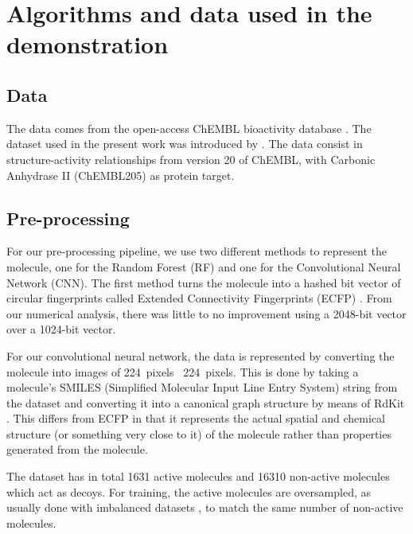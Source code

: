 \documentclass[\ifafour a4paper,12pt,\else a5paper,10pt,\fi%
onecolumn,oneside,article,%
british%
]{memoir}
\theoremstyle{remark}
\theoremstyle{innote}
\renewcommand*{\|}[1][]{\nonscript\:#1\vert\nonscript\:\mathopen{}}
\begin{document}
\section{Algorithms and data used in the demonstration}
 
\subsection{Data} 
  
The data comes from the open-access ChEMBL bioactivity database \autocites{bentoetal2014}. The dataset used in the present work was introduced by \textcite{koutsoukasetal2017}. The data consist in structure-activity relationships from version 20 of ChEMBL, with Carbonic Anhydrase II (ChEMBL205) as protein target.


\subsection{Pre-processing} 

For our pre-processing pipeline, we use two different methods to represent the molecule, one for the Random Forest (RF) and one for the Convolutional Neural Network (CNN). The first method turns the molecule into a hashed bit vector of circular fingerprints called Extended Connectivity Fingerprints (ECFP) \autocites{rogersetal2010}. From our numerical analysis, there was little to no improvement using a 2048-bit vector over a 1024-bit vector. 
  
For our convolutional neural network, the data is represented by converting the molecule into images of 224~pixels \texttimes\ 224~pixels. This is done by taking a molecule's SMILES (Simplified Molecular Input Line Entry System) string \autocites{davidetal2020} from the dataset and converting it into a canonical graph structure by means of RdKit \autocites{rdkit2017}. This differs from ECFP in that it represents the actual spatial and chemical structure (or something very close to it) of the molecule rather than properties generated from the molecule.

The dataset has in total 1631 active molecules and 16310 non-active molecules which act as decoys. For training, the active molecules are oversampled, as usually done with imbalanced datasets \autocites{provost2000}, to match the same number of non-active molecules.
\end{document}
